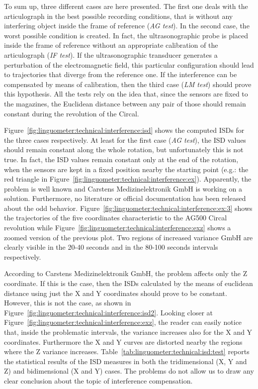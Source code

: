 To sum up, three different cases are here presented. 
The first one deals with the articulograph in the best possible recording
conditions, that is without any interfering object inside the frame of 
reference (\emph{AG test}).
In the second case, the worst possible condition is created. In fact, the
ultrasonographic probe is placed inside the frame of reference without an
appropriate calibration of the articulograph (\emph{IF test}).
If the ultrasonographic transducer generates a perturbation of the
electromagnetic field, this particular configuration should lead to 
trajectories that diverge from the reference one.
If the interference can be compensated by means of calibration, then the
third case (\emph{LM test}) should prove this hypothesis.
All the tests rely on the idea that, since the sensors
are fixed to the magazines,
the Euclidean distance between any pair of those should remain constant during
the revolution of the Circal.

Figure~\ref{fig:linguometer:technical:interference:isd} shows the computed
ISDs for the three cases respectively.
At least for the first case (\emph{AG test}), the ISD values should remain
constant along the whole rotation, but unfortunately this is not true.
In fact, the ISD values remain constant only at the end of the rotation, when
the sensors are kept in a fixed position nearby the starting point
(e.g.: the red triangle in 
Figure~\ref{fig:linguometer:technical:interference:ex}).
Apparently, the problem is well known and Carstens
Medizinelektronik GmbH is working on a solution. Furthermore, no literature or
official documentation has been released about the odd behavior.
Figure~\ref{fig:linguometer:technical:interference:ex:3} shows the trajectories 
of the five coordinates characteristic to the AG500 Circal revolution while
Figure~\ref{fig:linguometer:technical:interference:exz} shows a zoomed version
of the previous plot. 
Two regions of increased variance
GmbH are clearly visible in the 20-40 seconds and in the 80-100 seconds
intervals respectively.


According to Carstens Medizinelektronik GmbH, the problem affects only the Z
coordinate. If this is the case, then the ISDs calculated by the means of
euclidean distance using just the X and Y coordinates should prove to be
constant.
However, this is not the case, as shown in 
Figure~\ref{fig:linguometer:technical:interference:isd2}.
Looking closer at Figure~\ref{fig:linguometer:technical:interference:exz}, the
reader can easily notice that, inside the problematic intervals, the variance 
increases also for the X and Y coordinates. Furthermore the X and Y curves are
distorted nearby the regions where the Z variance increases.
Table~\ref{tab:linguometer:technical:isd:test} reports the statistical results
of the ISD measures in both the tridimensional (X, Y and Z) and bidimensional
(X and Y) cases.
%
The problems do not allow 
us to 
draw any clear conclusion about the topic of interference compensation.

